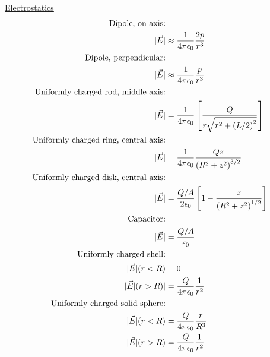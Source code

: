 \begin{multicols}{2}
	
	\begin{minipage}{\columnwidth}
		\centering\underline{Electrostatics}
		\begin{align*}
			\text{Dipole, on-axis:}\\ |\vec{E}|&\approx \frac{1}{4\pi\epsilon_0}\frac{2p}{r^3}\\
			\text{Dipole, perpendicular:}\\ |\vec{E}|&\approx \frac{1}{4\pi\epsilon_0}\frac{p}{r^3}\\
			\text{Uniformly charged rod, middle axis:}\\ |\vec{E}|&=\frac{1}{4\pi\epsilon_0}\left[\frac{Q}{r\sqrt{r^2+\left(L/2\right)^2}}\right]\\
			\text{Uniformly charged ring, central axis:}\\
			|\vec{E}|&=\frac{1}{4\pi\epsilon_0}\frac{Qz}{\left(R^2+z^2\right)^{3/2}}\\
			\text{Uniformly charged disk, central axis:}\\|\vec{E}|&=\frac{Q/A}{2\epsilon_0}\left[1-\frac{z}{\left(R^2+z^2\right)^{1/2}}\right]\\
			\text{Capacitor:}\\|\vec{E}|&=\frac{Q/A}{\epsilon_0}\\
			\text{Uniformly charged shell:}\\
			|\vec{E}|(r<R) &= 0\\|\vec{E}|(r>R)|&=\frac{Q}{4\pi\epsilon_0}\frac{1}{r^2}\\
			\text{Uniformly charged solid sphere:}\\
			|\vec{E}|(r<R)&=\frac{Q}{4\pi\epsilon_0}\frac{r}{R^3}\\
			|\vec{E}|(r>R)&=\frac{Q}{4\pi\epsilon_0}\frac{1}{r^2}
		\end{align*}
	\end{minipage}
	
\end{multicols}